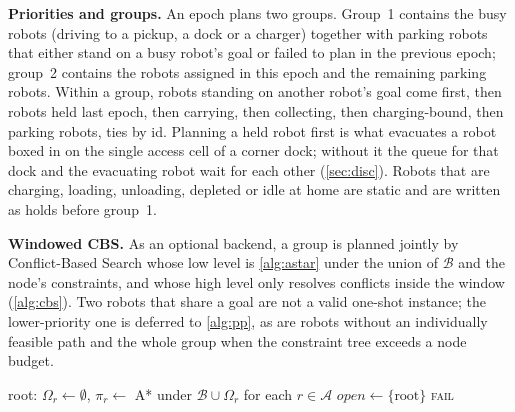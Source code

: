 \noindent\textbf{Priorities and groups.}
An epoch plans two groups. Group~1 contains the busy robots (driving to a
pickup, a dock or a charger) together with parking robots that either stand
on a busy robot's goal or failed to plan in the previous epoch; group~2
contains the robots assigned in this epoch and the remaining parking robots.
Within a group, robots standing on another robot's goal come first, then
robots held last epoch, then carrying, then collecting, then charging-bound,
then parking robots, ties by id. Planning a held robot first is what evacuates
a robot boxed in on the single access cell of a corner dock; without it the
queue for that dock and the evacuating robot wait for each other
(\cref{sec:disc}). Robots that are charging, loading, unloading, depleted or
idle at home are static and are written as holds before group~1.

\noindent\textbf{Windowed CBS.}
As an optional backend, a group is planned jointly by Conflict-Based Search
\citep{sharon2015cbs} whose low level is \cref{alg:astar} under the union of
$\mathcal{B}$ and the node's constraints, and whose high level only resolves
conflicts inside the window (\cref{alg:cbs}). Two robots that share a goal
are not a valid one-shot instance; the lower-priority one is deferred to
\cref{alg:pp}, as are robots without an individually feasible path and the
whole group when the constraint tree exceeds a node budget.

\begin{algorithm}[t]
\caption{Windowed CBS for one group (high level)}\label{alg:cbs}
root: $\Omega_r\gets\emptyset$, $\pi_r\gets$ \textsc{A*} under $\mathcal{B}\cup\Omega_r$ for each $r\in\mathcal{A}$\;
$\mathit{open}\gets\{\text{root}\}$\;
\Return \textsc{fail}\;
\end{algorithm}

